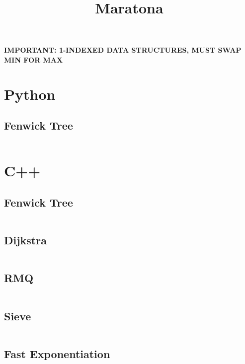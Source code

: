 \documentclass{article}
\title{Maratona}
\author{}
\date{}
\begin{document}
\maketitle

\textbf{IMPORTANT: 1-INDEXED DATA STRUCTURES, MUST SWAP MIN FOR MAX}

\tableofcontents
\newpage

\section{Python}
\subsection{Fenwick Tree}
\inputminted{python}{code/fenwick.py}

\section{C++}
\subsection{Fenwick Tree}
\inputminted[obeytabs=true,tabsize=4]{cpp}{code/fenwick.cpp}
\subsection{Dijkstra}
\inputminted[obeytabs=true,tabsize=4]{cpp}{code/dijkstra.cpp}
\subsection{RMQ}
\inputminted[obeytabs=true,tabsize=4]{cpp}{code/rmq.cpp}
\subsection{Sieve}
\inputminted[obeytabs=true,tabsize=4]{cpp}{code/sieve.cpp}
\subsection{Fast Exponentiation}
\inputminted[obeytabs=true,tabsize=4]{cpp}{code/fast_exp.cpp}
\end{document}
